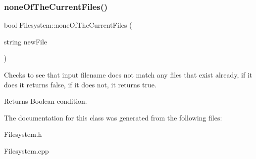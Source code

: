 \subsubsection{\texorpdfstring{none\+Of\+The\+Current\+Files()}{noneOfTheCurrentFiles()}}
{\footnotesize\ttfamily bool Filesystem\+::none\+Of\+The\+Current\+Files (\begin{DoxyParamCaption}\item[{string}]{new\+File }\end{DoxyParamCaption})}

Checks to see that input filename does not match any files that exist already, if it does it returns false, if it does not, it returns true. \begin{DoxyReturn}{Returns}
Boolean condition. 
\end{DoxyReturn}


The documentation for this class was generated from the following files\+:\begin{DoxyCompactItemize}
\item 
Filesystem.\+h\item 
Filesystem.\+cpp\end{DoxyCompactItemize}
